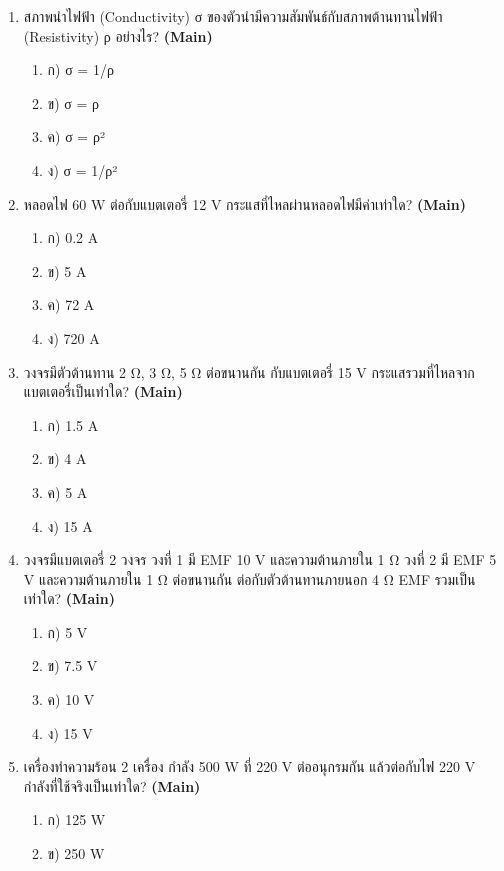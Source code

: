 \documentclass[12pt]{article}
\begin{document}
\begin{enumerate}[label=\arabic*.]
\begin{enumerate}[label=)]
\item ค) I = 4 A, V = 18 V
\item ง) I = 4 A, V = 24 V
\end{enumerate}
\item สภาพนำไฟฟ้า (Conductivity) σ ของตัวนำมีความสัมพันธ์กับสภาพต้านทานไฟฟ้า (Resistivity) ρ อย่างไร? \hfill \textbf{\small (Main)}
\begin{enumerate}[label=)]
\item ก) σ = 1/ρ
\item ข) σ = ρ
\item ค) σ = ρ²
\item ง) σ = 1/ρ²
\end{enumerate}
\item หลอดไฟ 60 W ต่อกับแบตเตอรี่ 12 V กระแสที่ไหลผ่านหลอดไฟมีค่าเท่าใด? \hfill \textbf{\small (Main)}
\begin{enumerate}[label=)]
\item ก) 0.2 A
\item ข) 5 A
\item ค) 72 A
\item ง) 720 A
\end{enumerate}
\item วงจรมีตัวต้านทาน 2 Ω, 3 Ω, 5 Ω ต่อขนานกัน กับแบตเตอรี่ 15 V กระแสรวมที่ไหลจากแบตเตอรี่เป็นเท่าใด? \hfill \textbf{\small (Main)}
\begin{enumerate}[label=)]
\item ก) 1.5 A
\item ข) 4 A
\item ค) 5 A
\item ง) 15 A
\end{enumerate}
\item วงจรมีแบตเตอรี่ 2 วงจร วงที่ 1 มี EMF 10 V และความต้านภายใน 1 Ω วงที่ 2 มี EMF 5 V และความต้านภายใน 1 Ω ต่อขนานกัน ต่อกับตัวต้านทานภายนอก 4 Ω EMF รวมเป็นเท่าใด? \hfill \textbf{\small (Main)}
\begin{enumerate}[label=)]
\item ก) 5 V
\item ข) 7.5 V
\item ค) 10 V
\item ง) 15 V
\end{enumerate}
\item เครื่องทำความร้อน 2 เครื่อง กำลัง 500 W ที่ 220 V ต่ออนุกรมกัน แล้วต่อกับไฟ 220 V กำลังที่ใช้จริงเป็นเท่าใด? \hfill \textbf{\small (Main)}
\begin{enumerate}[label=)]
\item ก) 125 W
\item ข) 250 W

\end{enumerate}
\end{enumerate}
\end{document}
